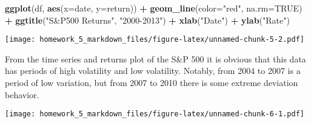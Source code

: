 \documentclass[]{article}
\newenvironment{Shaded}{\begin{snugshade}}{\end{snugshade}}
\newcommand{\KeywordTok}[1]{\textcolor[rgb]{0.13,0.29,0.53}{\textbf{#1}}}
\newcommand{\DataTypeTok}[1]{\textcolor[rgb]{0.13,0.29,0.53}{#1}}
\newcommand{\DecValTok}[1]{\textcolor[rgb]{0.00,0.00,0.81}{#1}}
\newcommand{\StringTok}[1]{\textcolor[rgb]{0.31,0.60,0.02}{#1}}
\newcommand{\CommentTok}[1]{\textcolor[rgb]{0.56,0.35,0.01}{\textit{#1}}}
\newcommand{\OtherTok}[1]{\textcolor[rgb]{0.56,0.35,0.01}{#1}}
\newcommand{\OperatorTok}[1]{\textcolor[rgb]{0.81,0.36,0.00}{\textbf{#1}}}
\newcommand{\NormalTok}[1]{#1}
\begin{document}
\begin{Shaded}
\begin{Highlighting}[]
\KeywordTok{ggplot}\NormalTok{(df, }\KeywordTok{aes}\NormalTok{(}\DataTypeTok{x=}\NormalTok{date, }\DataTypeTok{y=}\NormalTok{return)) }\OperatorTok{+}
\StringTok{  }\KeywordTok{geom_line}\NormalTok{(}\DataTypeTok{color=}\StringTok{"red"}\NormalTok{, }\DataTypeTok{na.rm=}\OtherTok{TRUE}\NormalTok{) }\OperatorTok{+}
\StringTok{  }\KeywordTok{ggtitle}\NormalTok{(}\StringTok{"S&P500 Returns"}\NormalTok{, }\StringTok{"2000-2013"}\NormalTok{) }\OperatorTok{+}
\StringTok{  }\KeywordTok{xlab}\NormalTok{(}\StringTok{"Date"}\NormalTok{) }\OperatorTok{+}
\StringTok{  }\KeywordTok{ylab}\NormalTok{(}\StringTok{"Rate"}\NormalTok{)}
\end{Highlighting}
\end{Shaded}

\texttt{[image: homework\_5\_markdown\_files/figure-latex/unnamed-chunk-5-2.pdf]}

From the time series and returns plot of the S\&P 500 it is obvious that
this data has periods of high volatility and low volatility. Notably,
from 2004 to 2007 is a period of low variation, but from 2007 to 2010
there is some extreme deviation behavior.

\begin{Shaded}
\end{Shaded}

\texttt{[image: homework\_5\_markdown\_files/figure-latex/unnamed-chunk-6-1.pdf]}

\begin{Shaded}
\end{Shaded}
\end{document}
